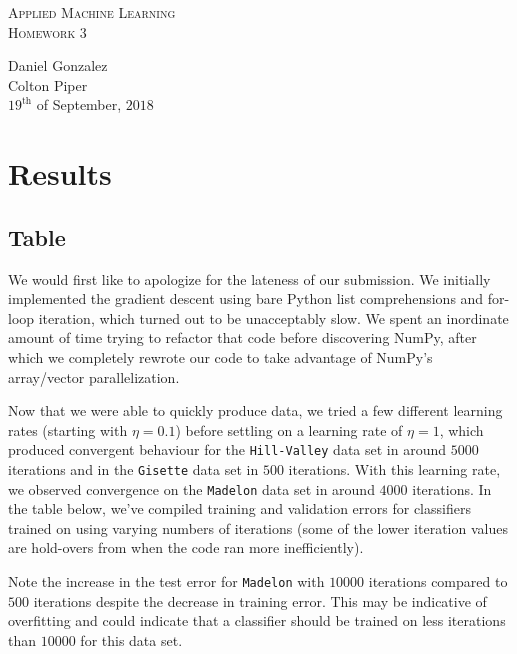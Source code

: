 \documentclass[UTF8]{article}
\begin{document}
\begin{center}
	\textsc{\huge Applied Machine Learning}\\
	\textsc{\Large Homework 3}\\
\end{center}
\begin{flushright}
	Daniel Gonzalez\\
    Colton Piper\\
	$19^{\text{th}}$ of September, $2018$
\end{flushright}


\section{Results}

\subsection{Table}
We would first like to apologize for the lateness of our submission.
We initially implemented the gradient descent using bare Python list comprehensions and for-loop iteration, which turned out to be unacceptably slow.
We spent an inordinate amount of time trying to refactor that code before discovering NumPy,
after which we completely rewrote our code to take advantage of NumPy's array/vector parallelization.

Now that we were able to quickly produce data,
we tried a few different learning rates (starting with $\eta = 0.1$) before settling on a learning rate of $\eta = 1$,
which produced convergent behaviour for the \texttt{Hill-Valley} data set in around $5000$ iterations and in the \texttt{Gisette} data set in $500$ iterations.
With this learning rate, we observed convergence on the \texttt{Madelon} data set in around $4000$ iterations.
In the table below, we've compiled training and validation errors for classifiers trained on using varying numbers of iterations
(some of the lower iteration values are hold-overs from when the code ran more inefficiently).

Note the increase in the test error for \texttt{Madelon} with $10000$ iterations compared to $500$ iterations despite the decrease in training error.
This may be indicative of overfitting and could indicate that a classifier should be trained on less iterations than $10000$ for this data set.
\end{document}
